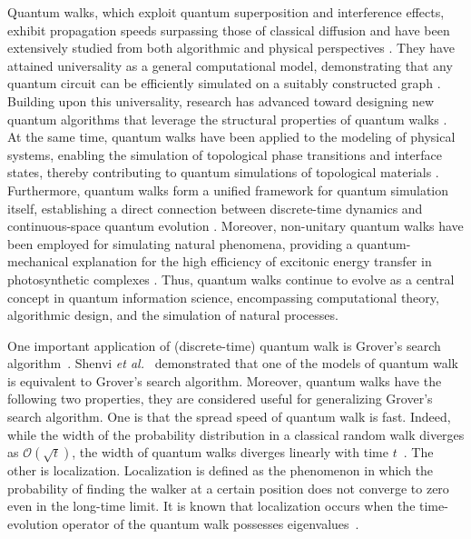 \documentclass[a4paper,12pt]{article}
\theoremstyle{plain}
\theoremstyle{definition}
\theoremstyle{definition}
\begin{document}
Quantum walks, which exploit quantum superposition and interference effects, exhibit propagation speeds surpassing those of classical diffusion and have been extensively studied from both algorithmic and physical perspectives \cite{Meyer1997}.
They have attained universality as a general computational model, demonstrating that any quantum circuit can be efficiently simulated on a suitably constructed graph \cite{ChildsEtAl2013,ChildsEtAl2009, LovettEtAl2010}.
Building upon this universality, research has advanced toward designing new quantum algorithms that leverage the structural properties of quantum walks \cite{Ambainis2004, Szegedy2004}.
At the same time, quantum walks have been applied to the modeling of physical systems, enabling the simulation of topological phase transitions and interface states, thereby contributing to quantum simulations of topological materials \cite{KitagawaEtAl2012,PanahiyanEtAl2019}. Furthermore, quantum walks form a unified framework for quantum simulation itself, establishing a direct connection between discrete-time dynamics and continuous-space quantum evolution \cite{Yepez2005}.
Moreover, non-unitary quantum walks have been employed for simulating natural phenomena, providing a quantum-mechanical explanation for the high efficiency of excitonic energy transfer in photosynthetic complexes \cite{MohseniEtAl2008}.
Thus, quantum walks continue to evolve as a central concept in quantum information science, encompassing computational theory, algorithmic design, and the simulation of natural processes.

One important application of (discrete-time) quantum walk is Grover's search algorithm~\cite{Grover1996}. Shenvi \textit{et al.}~\cite{ShenviEtAl2003} demonstrated that one of the models of quantum walk is equivalent to Grover’s search algorithm. Moreover, quantum walks have the following two properties, they are considered useful for generalizing Grover's search algorithm. One is that the spread speed of quantum walk is fast. Indeed, while the width of the probability distribution in a classical random walk diverges as $\mathcal{O}(\sqrt{t})$, the width of quantum walks diverges linearly with time $t$~\cite{KnightEtAl2003}. The other is localization. Localization is defined as the phenomenon in which the probability of finding the walker at a certain position does not converge to zero even in the long-time limit.  
It is known that localization occurs when the time-evolution operator of the quantum walk possesses eigenvalues~\cite{InuiEtAl2004}.
\end{document}
